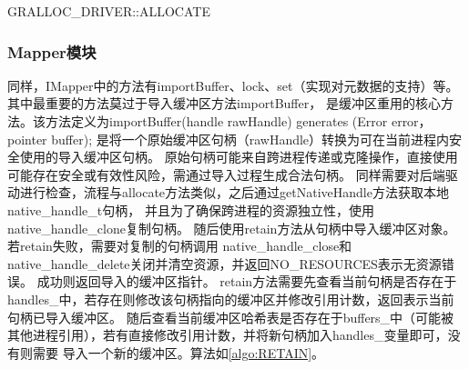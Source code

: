 \begin{algorithm}
  \caption{GRALLOC\_DRIVER::ALLOCATE}
  \label{algo:GRALLOC_DRIVER::ALLOCATE}
  \SetAlgoLined
  \end{algorithm}

\subsubsection{Mapper模块}
同样，IMapper中的方法有importBuffer、lock、set（实现对元数据的支持）等。其中最重要的方法莫过于导入缓冲区方法importBuffer，
是缓冲区重用的核心方法。该方法定义为importBuffer(handle rawHandle) generates (Error error， pointer buffer);
是将一个原始缓冲区句柄（rawHandle）转换为可在当前进程内安全使用的导入缓冲区句柄。
原始句柄可能来自跨进程传递或克隆操作，直接使用可能存在安全或有效性风险，需通过导入过程生成合法句柄。
同样需要对后端驱动进行检查，流程与allocate方法类似，之后通过getNativeHandle方法获取本地native\_handle\_t句柄，
并且为了确保跨进程的资源独立性，使用native\_handle\_clone复制句柄。
随后使用retain方法从句柄中导入缓冲区对象。若retain失败，需要对复制的句柄调用
native\_handle\_close和native\_handle\_delete关闭并清空资源，并返回NO\_RESOURCES表示无资源错误。
成功则返回导入的缓冲区指针。
retain方法需要先查看当前句柄是否存在于handles\_中，若存在则修改该句柄指向的缓冲区并修改引用计数，返回表示当前句柄已导入缓冲区。
随后查看当前缓冲区哈希表是否存在于buffers\_中（可能被其他进程引用），若有直接修改引用计数，并将新句柄加入handles\_变量即可，没有则需要
导入一个新的缓冲区。算法如\ref{algo:RETAIN}。


